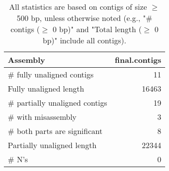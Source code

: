 \documentclass[12pt,a4paper]{article}
\begin{document}
\begin{table}[ht]
\begin{center}
\caption{All statistics are based on contigs of size $\geq$ 500 bp, unless otherwise noted (e.g., "\# contigs ($\geq$ 0 bp)" and "Total length ($\geq$ 0 bp)" include all contigs).}
\begin{tabular}{|l*{1}{|r}|}
\hline
Assembly & final.contigs \\ \hline
\# fully unaligned contigs & 11 \\ \hline
Fully unaligned length & 16463 \\ \hline
\# partially unaligned contigs & 19 \\ \hline
\hspace{5mm}\# with misassembly & 3 \\ \hline
\hspace{5mm}\# both parts are significant & 8 \\ \hline
Partially unaligned length & 22344 \\ \hline
\# N's & 0 \\ \hline
\end{tabular}
\end{center}
\end{table}
\end{document}
